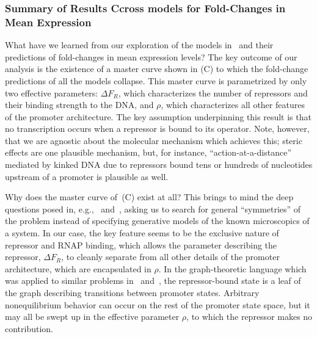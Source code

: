 \subsubsection{Summary of Results Ccross models for Fold-Changes in Mean Expression}
What have we learned from our exploration of the models
in~ and their predictions of fold-changes in mean
expression levels? The key outcome of our analysis is the existence of a master curve
 shown in (C) to which the fold-change predictions of all the
models collapse. This master curve is parametrized by only two effective
parameters: $\Delta F_R$, which characterizes the number of repressors and
their binding strength to the DNA, and $\rho$, which
characterizes all other features of the promoter architecture. The key
assumption underpinning this result is that no transcription occurs when a
repressor is bound to its operator. Note, however, that we are agnostic about
the molecular mechanism which achieves this; steric effects are one plausible
mechanism, but, for instance, ``action-at-a-distance'' mediated by kinked DNA
due to repressors bound tens or hundreds of nucleotides upstream of a promoter
is plausible as well.

Why does the master curve of~(C) exist at all? This
brings to mind the deep questions posed in, e.g.,~\cite{Frank2013}
and~\cite{Frank2014a}, asking us to search for general ``symmetries'' of the
problem instead of specifying generative models of the known microscopics of a
system. In our case, the key feature seems to be the exclusive nature of
repressor and RNAP binding, which allows the parameter describing the repressor,
$\Delta F_R$, to cleanly separate from all other details of the promoter
architecture, which are encapsulated in $\rho$. In the graph-theoretic language
which was applied to similar problems in~\cite{Gunawardena2012}
and~\cite{Ahsendorf2014}, the repressor-bound state is a leaf of the graph
describing transitions between promoter states. Arbitrary nonequilibrium
behavior can occur on the rest of the promoter state space, but it may all be
swept up in the effective parameter $\rho$, to which the repressor makes no
contribution.

